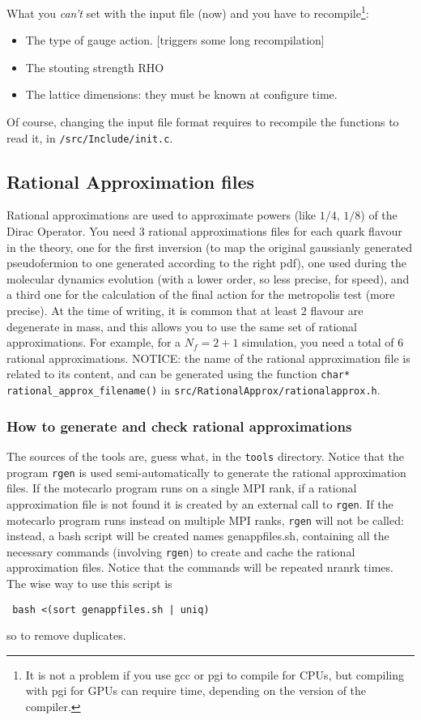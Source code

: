 What you \emph{can't} set with the input file (now) and you have to
recompile\footnote{ It is not a problem if you use gcc or pgi to compile for 
    CPUs, but compiling with pgi for GPUs can require time, depending on the
version of the compiler.}:
\begin{itemize}
    \item The type of gauge action. [triggers some long recompilation]
    \item The stouting strength RHO 
    \item The lattice dimensions: they must be known at \textsf{ configure} time.
\end{itemize}
Of course, changing the input file format requires to recompile the functions 
to read it, in \verb|/src/Include/init.c|.

\subsection{ Rational Approximation files}
Rational approximations are used to approximate powers (like $1/4$,
$1/8$) of the Dirac Operator.
You need $3$ rational approximations files for each quark flavour in the
theory, one for the first inversion (to map the original
gaussianly generated pseudofermion to one generated according to the
right pdf), one used during the molecular dynamics evolution (with a
lower order, so less precise, for speed), and a third one for the
calculation of the final action for the metropolis test (more
precise). At the time of writing, it is common that at least 2 flavour are 
degenerate in mass, and this allows you to use the same set of rational
approximations. For example, for a $N_f=2+1$ simulation, you need a total
of 6 rational approximations.
NOTICE: the name of the rational approximation file is related to
its content, and can be generated using the function
\verb|char* rational_approx_filename()| in
\verb|src/RationalApprox/rationalapprox.h|.

\subsubsection{ How to generate and check rational approximations}
The sources of the tools are, guess what, in  the \verb|tools| directory.
Notice that the program \verb|rgen| is used semi-automatically to generate the 
rational approximation files. If the motecarlo program runs on a single MPI rank, 
if a rational approximation file is not found it is created by an external call to \verb|rgen|.
If the motecarlo program runs instead on multiple MPI ranks, \verb|rgen| will not be called: 
instead, a bash script will be created names \textsf{ genappfiles.sh}, containing all the necessary commands (involving \verb|rgen|)
to create and cache the rational approximation files. Notice that the commands 
will be repeated \textsf{ nranrk} times. The wise way to use this script is 
\begin{verbatim}
 bash <(sort genappfiles.sh | uniq)
\end{verbatim}
so to remove duplicates.

